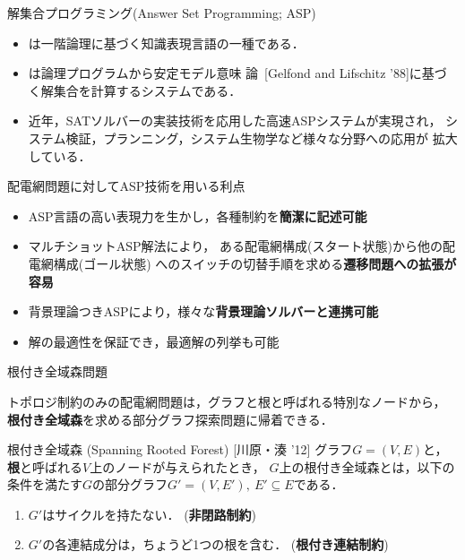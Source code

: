 \documentclass[dvipdfmx,11pt]{beamer}
\begin{document}
\begin{frame}{解集合プログラミング(Answer Set Programming; ASP)}
  \begin{itemize}
  \item {}は一階論理に基づく知識表現言語の一種である．
  \item {}は論理プログラムから安定モデル意味
    論~[Gelfond and Lifschitz '88]に基づく解集合を計算するシステムである．
  \item 近年，SATソルバーの実装技術を応用した高速ASPシステムが実現され，
    システム検証，プランニング，システム生物学など様々な分野への応用が
    拡大している．
  \end{itemize}
  \vfill
  \begin{alertblock}{配電網問題に対してASP技術を用いる利点}
    \begin{itemize}
    \item ASP言語の高い表現力を生かし，各種制約を\textbf{簡潔に記述可能}
    \item マルチショットASP解法により，
      ある配電網構成(スタート状態)から他の配電網構成(ゴール状態)
      へのスイッチの切替手順を求める\textbf{遷移問題への拡張が容易}
    \item 背景理論つきASPにより，様々な\textbf{背景理論ソルバーと連携可能}
    \item 解の最適性を保証でき，最適解の列挙も可能
    \end{itemize}
  \end{alertblock}
\end{frame}
\begin{frame}{根付き全域森問題}
  \begin{alertblock}{}
    トポロジ制約のみの配電網問題は，グラフと根と呼ばれる特別なノードから，
    \alert{\bf 根付き全域森}を求める部分グラフ探索問題に帰着できる．
  \end{alertblock}
  \vfill
  \begin{block}{根付き全域森 (Spanning Rooted Forest) [川原・湊 '12]}
    グラフ$G=(V,E)$と，
    \textbf{根}と呼ばれる$V$上のノードが与えられたとき，
    $G$上の根付き全域森とは，以下の条件を満たす$G$の部分グラフ$G'=(V,E'),\ E' \subseteq E$である．
    \begin{enumerate}
    \item $G'$はサイクルを持たない． (\alert{\bf 非閉路制約})
    \item $G'$の各連結成分は，ちょうど1つの根を含む． (\alert{\bf 根付き連結制約})
    \end{enumerate}
  \end{block}
\end{frame}
\end{document}
